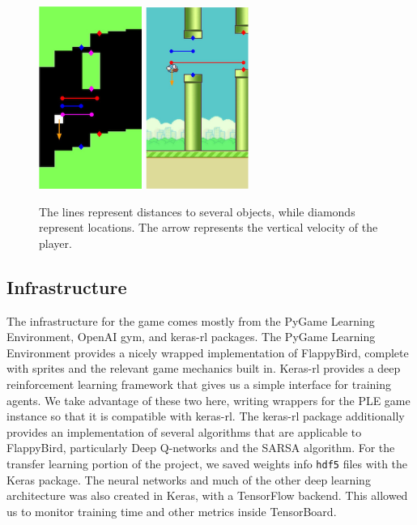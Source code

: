\documentclass{article}
\begin{document}
\begin{figure}[h!]
\begin{center}
\includegraphics[width=0.3\textwidth]{pixelcopter-features}
\includegraphics[width=0.3\textwidth]{flappybird-features}
\end{center}
\caption{The lines represent distances to several objects, while diamonds represent locations. The arrow represents the vertical velocity of the player.}
\label{fig:features}
\end{figure}

\subsection{Infrastructure}

The infrastructure for the game comes mostly from the PyGame Learning Environment, OpenAI gym, and keras-rl packages. 
The PyGame Learning Environment provides a nicely wrapped implementation of FlappyBird, complete with sprites and the relevant game mechanics built in. \cite{ple} \cite{openaigym} \cite{ale}
Keras-rl provides a deep reinforcement learning framework that gives us a simple interface for training agents. 
We take advantage of these two here, writing wrappers for the PLE game instance so that it is compatible with keras-rl. \cite{kerasrl}
The keras-rl package additionally provides an implementation of several algorithms that are applicable to FlappyBird, particularly Deep Q-networks and the SARSA algorithm.
For the transfer learning portion of the project, we saved weights info \texttt{hdf5} files with the Keras package.
The neural networks and much of the other deep learning architecture was also created in Keras, with a TensorFlow backend. \cite{keras} \cite{tensorflow}
This allowed us to monitor training time and other metrics inside TensorBoard.
\end{document}
